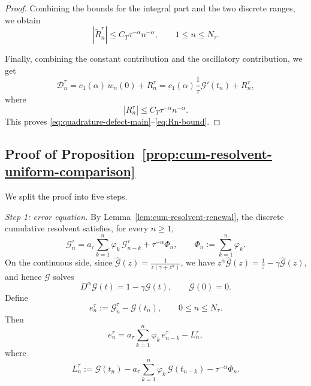 \documentclass[letterpaper]{article}
\numberwithin{equation}{section}
\theoremstyle{definition}
\theoremstyle{remark}
\begin{document}
\begin{proof}
Combining the bounds for the integral part and the two discrete ranges, we obtain
\[
  |\widetilde R_n^\tau|
  \le
  C_T\tau^{-\alpha}n^{-\alpha},
  \qquad 1\le n\le N_\tau.
\]

Finally, combining the constant contribution and the oscillatory contribution,
we get
\[
  \mathcal D_n^\tau
  =
  c_1(\alpha)\,w_n(0)+R_n^\tau
  =
  c_1(\alpha)\frac1\tau \mathcal G'(t_n)+R_n^\tau,
\]
where
\[
  |R_n^\tau|
  \le
  C_T\tau^{-\alpha}n^{-\alpha}.
\]
This proves \eqref{eq:quadrature-defect-main}--\eqref{eq:Rn-bound}.
\end{proof}



\subsection{Proof of Proposition~\ref{prop:cum-resolvent-uniform-comparison}}\label{app:proof-cum-resolvent-uniform-comparison}
We split the proof into five steps.

\medskip
\noindent
\textit{Step 1: error equation.}
By Lemma~\ref{lem:cum-resolvent-renewal}, the discrete cumulative resolvent
satisfies, for every $n\ge1$,
\begin{equation}\label{eq:Gtau-renewal-proof}
  \mathcal G_n^\tau
  =
  a_\tau\sum_{k=1}^n\varphi_k\,\mathcal G_{n-k}^\tau
  +\tau^{-\alpha}\Phi_n,
  \qquad
  \Phi_n:=\sum_{k=1}^n\varphi_k.
\end{equation}
On the continuous side, since
$\widehat{\mathcal G}(z)=\frac{1}{z(\gamma+z^\alpha)}$,
we have
$z^\alpha\widehat{\mathcal G}(z)=\frac1z-\gamma\widehat{\mathcal G}(z)$,
and hence $\mathcal G$ solves
\begin{equation}\label{eq:G-cont-fde-proof}
  D^\alpha\mathcal G(t)=1-\gamma\mathcal G(t),
  \qquad
  \mathcal G(0)=0.
\end{equation}
Define
\[
  e_n^\tau:=\mathcal G_n^\tau-\mathcal G(t_n),
  \qquad 0\le n\le N_\tau.
\]
Then
\begin{equation}\label{eq:error-renewal-proof}
  e_n^\tau
  =
  a_\tau\sum_{k=1}^n\varphi_k\,e_{n-k}^\tau
  -L_n^\tau,
\end{equation}
where
\begin{equation}\label{eq:local-defect-def-proof}
  L_n^\tau
  :=
  \mathcal G(t_n)
  -
  a_\tau\sum_{k=1}^n\varphi_k\,\mathcal G(t_{n-k})
  -
  \tau^{-\alpha}\Phi_n.
\end{equation}
\end{document}

